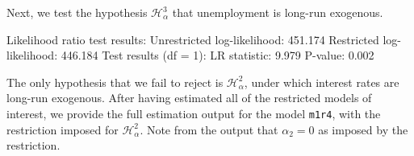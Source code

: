 \documentclass[article]{jss}
\begin{document}
Next, we test the hypothesis $\mathscr{H}_{\alpha}^3$ that unemployment is long-run exogenous.

\begin{CodeChunk} 
\begin{CodeOutput}
Likelihood ratio test results:
Unrestricted log-likelihood: 451.174
Restricted log-likelihood:   446.184
Test results (df = 1):
LR statistic: 	 9.979
P-value: 	 0.002
\end{CodeOutput}
\end{CodeChunk}  

The only hypothesis that we fail to reject is $_{\alpha}^2$, under which interest rates are long-run exogenous. 
After having estimated all of the restricted models of interest, we provide the full estimation output for the model \verb|m1r4|, with the restriction imposed for $_{\alpha}^2$. 
Note from the output that $\alpha_2 = 0$ as imposed by the restriction.
\end{document}
